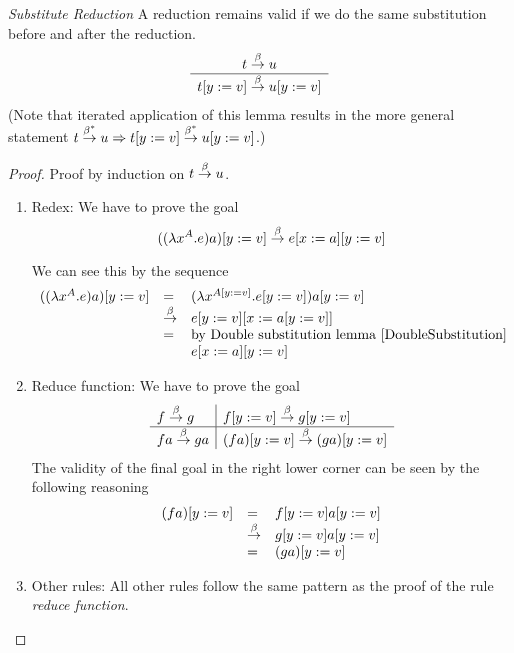 \begin{theorem}
    \label{SubstituteReduction}
    \emph{Substitute Reduction} A reduction remains valid if we do the same
    substitution before and after the reduction.
    $$
    \begin{array}{c} 
        t \stackrel{\beta}{\to} u
     \\ \hline 
        t[y:=v] \stackrel{\beta}{\to} u[y:=v]
    \end{array}
    $$
    (Note that iterated application of this lemma results in the more general
    statement $t \stackrel{\beta^*}{\to} u \Rightarrow t[y:=v] \stackrel{\beta^*}{\to} u[y:=v]$.)

    \begin{proof}
        Proof by induction on $t \stackrel{\beta}{\to} u$.


        \begin{enumerate}

        \item Redex: We have to prove the goal
            $$
                ((\lambda x^A. e) a)[y:=v] \stackrel{\beta}{\to} e[x:=a][y:=v]
            $$

            We can see this by the sequence
            $$
            \begin{array}{lll}
                ((\lambda x^A. e) a)[y:=v]
                &=&
                (\lambda x^{A[y:=v]}. e[y:=v]) a[y:=v]
                \\
                &\stackrel{\beta}{\to}&
                e[y:=v][x:=a[y:=v]]
                \\
                &=& \text{by Double substitution lemma~\ref{DoubleSubstitution}}
                \\
                &&e[x:=a][y:=v]
            \end{array}
            $$

        \item Reduce function: We have to prove the goal
            $$
            \begin{array}{l|l}
                f \stackrel{\beta}{\to} g
                & f[y:=v] \stackrel{\beta}{\to} g[y:=v]
                \\
                \hline
                f a \stackrel{\beta}{\to} g a
                &(f a)[y:=v] \stackrel{\beta}{\to} (g a)[y:=v]
            \end{array}
            $$
            The validity of the final goal in the right lower corner can be seen
            by the following reasoning
            $$
            \begin{array}{lll}
                (f a)[y:=v]
                &=&
                f[y:=v] a[y:=v]
                \\
                &\stackrel{\beta}{\to}&
                g[y:=v] a[y:=v]
                \\
                &=&
                (g a)[y:=v]
            \end{array}
            $$

        \item Other rules: All other rules follow the same pattern as the proof
            of the rule \emph{reduce function}.
        \end{enumerate}
    \end{proof}
\end{theorem}




